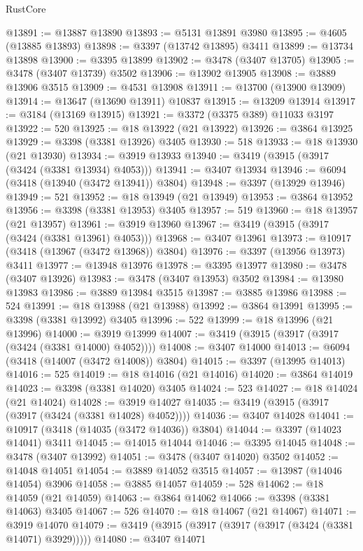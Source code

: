 \begin{lexlean}{RustCore}
\begin{coremodule}
@13891 := @13887 @13890
@13893 := @5131 @13891 @3980
@13895 := @4605 (@13885 @13893)
@13898 := @3397 (@13742 @13895) @3411
@13899 := @13734 @13898
@13900 := @3395 @13899
@13902 := @3478 (@3407 @13705)
@13905 := @3478 (@3407 @13739) @3502
@13906 := @13902 @13905
@13908 := @3889 @13906 @3515
@13909 := @4531 @13908
@13911 := @13700 (@13900 @13909)
@13914 := @13647 (@13690 @13911) @10837
@13915 := @13209 @13914
@13917 := @3184 (@13169 @13915)
@13921 := @3372 (@3375 @389) @11033 @3197
@13922 := 520
@13925 := @18 @13922 (@21 @13922)
@13926 := @3864 @13925
@13929 := @3398 (@3381 @13926) @3405
@13930 := 518
@13933 := @18 @13930 (@21 @13930)
@13934 := @3919 @13933
@13940 := @3419 (@3915 (@3917 (@3424 (@3381 @13934) @4053)))
@13941 := @3407 @13934
@13946 := @6094 (@3418 (@13940 (@3472 @13941)) @3804)
@13948 := @3397 (@13929 @13946)
@13949 := 521
@13952 := @18 @13949 (@21 @13949)
@13953 := @3864 @13952
@13956 := @3398 (@3381 @13953) @3405
@13957 := 519
@13960 := @18 @13957 (@21 @13957)
@13961 := @3919 @13960
@13967 := @3419 (@3915 (@3917 (@3424 (@3381 @13961) @4053)))
@13968 := @3407 @13961
@13973 := @10917 (@3418 (@13967 (@3472 @13968)) @3804)
@13976 := @3397 (@13956 @13973) @3411
@13977 := @13948 @13976
@13978 := @3395 @13977
@13980 := @3478 (@3407 @13926)
@13983 := @3478 (@3407 @13953) @3502
@13984 := @13980 @13983
@13986 := @3889 @13984 @3515
@13987 := @3885 @13986
@13988 := 524
@13991 := @18 @13988 (@21 @13988)
@13992 := @3864 @13991
@13995 := @3398 (@3381 @13992) @3405
@13996 := 522
@13999 := @18 @13996 (@21 @13996)
@14000 := @3919 @13999
@14007 := @3419 (@3915 (@3917 (@3917 (@3424 (@3381 @14000) @4052))))
@14008 := @3407 @14000
@14013 := @6094 (@3418 (@14007 (@3472 @14008)) @3804)
@14015 := @3397 (@13995 @14013)
@14016 := 525
@14019 := @18 @14016 (@21 @14016)
@14020 := @3864 @14019
@14023 := @3398 (@3381 @14020) @3405
@14024 := 523
@14027 := @18 @14024 (@21 @14024)
@14028 := @3919 @14027
@14035 := @3419 (@3915 (@3917 (@3917 (@3424 (@3381 @14028) @4052))))
@14036 := @3407 @14028
@14041 := @10917 (@3418 (@14035 (@3472 @14036)) @3804)
@14044 := @3397 (@14023 @14041) @3411
@14045 := @14015 @14044
@14046 := @3395 @14045
@14048 := @3478 (@3407 @13992)
@14051 := @3478 (@3407 @14020) @3502
@14052 := @14048 @14051
@14054 := @3889 @14052 @3515
@14057 := @13987 (@14046 @14054) @3906
@14058 := @3885 @14057
@14059 := 528
@14062 := @18 @14059 (@21 @14059)
@14063 := @3864 @14062
@14066 := @3398 (@3381 @14063) @3405
@14067 := 526
@14070 := @18 @14067 (@21 @14067)
@14071 := @3919 @14070
@14079 := @3419 (@3915 (@3917 (@3917 (@3917 (@3424 (@3381 @14071) @3929)))))
@14080 := @3407 @14071

\end{coremodule}
\end{lexlean}
